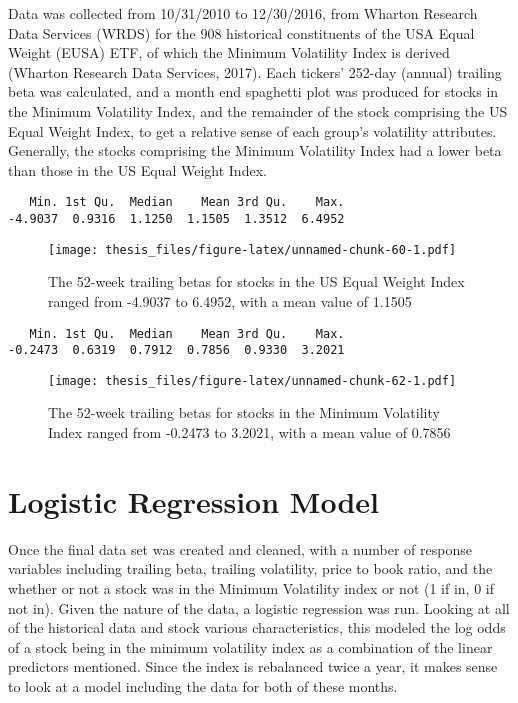 \documentclass[12pt,twoside]{reedthesis}
\theoremstyle{definition}
\theoremstyle{definition}
\theoremstyle{definition}
\theoremstyle{remark}
\begin{document}
Data was collected from 10/31/2010 to 12/30/2016, from Wharton Research
Data Services (WRDS) for the 908 historical constituents of the USA
Equal Weight (EUSA) ETF, of which the Minimum Volatility Index is
derived (Wharton Research Data Services, 2017). Each tickers' 252-day
(annual) trailing beta was calculated, and a month end spaghetti plot
was produced for stocks in the Minimum Volatility Index, and the
remainder of the stock comprising the US Equal Weight Index, to get a
relative sense of each group's volatility attributes. Generally, the
stocks comprising the Minimum Volatility Index had a lower beta than
those in the US Equal Weight Index.
\begin{verbatim}
   Min. 1st Qu.  Median    Mean 3rd Qu.    Max. 
-4.9037  0.9316  1.1250  1.1505  1.3512  6.4952 
\end{verbatim}
\begin{figure}[htbp]
\centering
\texttt{[image: thesis\_files/figure-latex/unnamed-chunk-60-1.pdf]}
\caption{\label{fig:unnamed-chunk-60}The 52-week trailing betas for stocks
in the US Equal Weight Index ranged from -4.9037 to 6.4952, with a mean
value of 1.1505}
\end{figure}
\begin{verbatim}
   Min. 1st Qu.  Median    Mean 3rd Qu.    Max. 
-0.2473  0.6319  0.7912  0.7856  0.9330  3.2021 
\end{verbatim}
\begin{figure}[htbp]
\centering
\texttt{[image: thesis\_files/figure-latex/unnamed-chunk-62-1.pdf]}
\caption{\label{fig:unnamed-chunk-62}The 52-week trailing betas for stocks
in the Minimum Volatility Index ranged from -0.2473 to 3.2021, with a
mean value of 0.7856}
\end{figure}
\chapter{Logistic Regression Model}\label{logistic-regression-model}

Once the final data set was created and cleaned, with a number of
response variables including trailing beta, trailing volatility, price
to book ratio, and the whether or not a stock was in the Minimum
Volatility index or not (1 if in, 0 if not in). Given the nature of the
data, a logistic regression was run. Looking at all of the historical
data and stock various characteristics, this modeled the log odds of a
stock being in the minimum volatility index as a combination of the
linear predictors mentioned. Since the index is rebalanced twice a year,
it makes sense to look at a model including the data for both of these
months.
\end{document}
